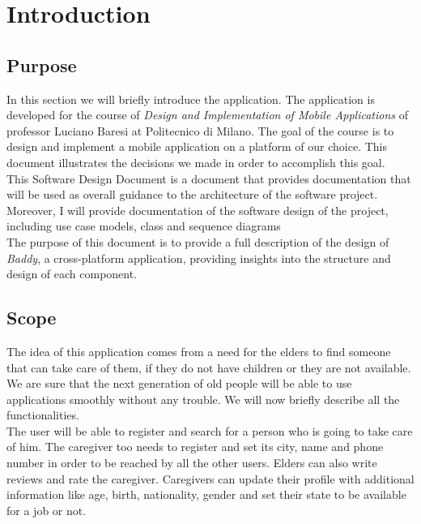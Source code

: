 \documentclass[../../dd.tex]{subfiles}
\begin{document}
\chapter{Introduction}
\section{Purpose}
    In this section we will briefly introduce the application.
    The application is developed for
    the course of \textit{Design and Implementation of Mobile Applications} of professor Luciano Baresi
    at Politecnico di Milano.
    The goal of the course is to design and implement a mobile application on
    a platform of our choice.
    This document illustrates the decisions we made in
    order to accomplish this goal.
    \\

    This Software Design Document is a document that provides documentation that will be used as
    overall guidance to the architecture of the software project.
    Moreover, I will provide documentation of the software design of the
    project, including use case models, class and sequence diagrams
    \\

    The purpose of this document is to provide a full description of the design of \textit{Baddy},
    a cross-platform application, providing insights into the structure and design of each component.

    \section{Scope}
    The idea of this application comes from a need for the elders to find someone that can take care of them,
    if they do not have children or they are not available.
    We are sure that the next generation of old people will be able to use applications smoothly without any trouble.
    We will now briefly describe all the functionalities.
    \\

    The user will be able to register and search for a person who is going to take care of him.
    The caregiver too needs to register and set its city, name and phone number in order to be reached by all
    the other users.
    Elders can also write reviews and rate the caregiver.
    Caregivers can update their profile with additional information like age, birth, nationality, gender and set their
    state to be available for a job or not.
\end{document}

